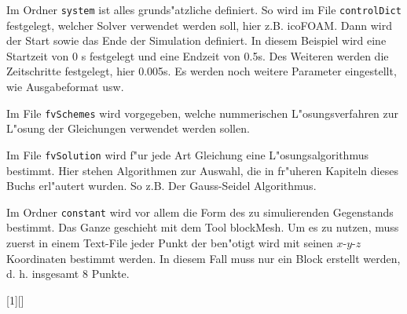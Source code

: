 \begin{refsection}
Im Ordner  \texttt{system} ist alles grunds"atzliche definiert. So wird
im File  \texttt{controlDict} festgelegt, welcher Solver verwendet
werden soll, hier z.B. icoFOAM. Dann wird der Start sowie das Ende
der Simulation definiert. In diesem Beispiel wird eine Startzeit von
0 s festgelegt und eine Endzeit von 0.5s. Des Weiteren werden die
Zeitschritte festgelegt, hier 0.005s. Es werden noch weitere Parameter
eingestellt, wie Ausgabeformat usw.

Im File  \texttt{fvSchemes} wird vorgegeben, welche nummerischen
L"osungsverfahren zur L"osung der Gleichungen verwendet werden sollen.

Im File \texttt{fvSolution} wird f"ur jede Art Gleichung eine
L"osungsalgorithmus bestimmt.  Hier stehen Algorithmen zur Auswahl,
die in fr"uheren Kapiteln dieses Buchs erl"autert wurden. So z.B. Der
Gauss-Seidel Algorithmus.



Im Ordner  \texttt{constant} wird vor allem die Form des zu simulierenden
Gegenstands bestimmt. Das Ganze geschieht mit dem Tool blockMesh. Um
es zu nutzen, muss zuerst in einem Text-File jeder Punkt der ben"otigt
wird mit seinen $x$-$y$-$z$ Koordinaten bestimmt werden. In diesem Fall muss
nur ein Block erstellt werden, d. h. insgesamt 8 Punkte.

[1][]
  {}{\vspace{0em}}


\end{refsection}

